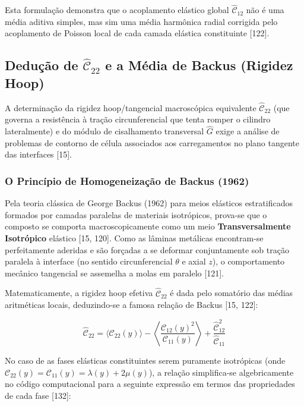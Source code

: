 Esta formulação demonstra que o acoplamento elástico global $\hat{\mathcal{C}}_{12}$ não é uma média aditiva simples, mas sim uma média harmônica radial corrigida pelo acoplamento de Poisson local de cada camada elástica constituinte [122].

\subsection{Dedução de $\hat{\mathcal{C}}_{22}$ e a Média de Backus (Rigidez Hoop)}

A determinação da rigidez hoop/tangencial macroscópica equivalente $\hat{\mathcal{C}}_{22}$ (que governa a resistência à tração circunferencial que tenta romper o cilindro lateralmente) e do módulo de cisalhamento transversal $\hat{G}$ exige a análise de problemas de contorno de célula associados aos carregamentos no plano tangente das interfaces [15].

\subsubsection{O Princípio de Homogeneização de Backus (1962)}

Pela teoria clássica de George Backus (1962) para meios elásticos estratificados formados por camadas paralelas de materiais isotrópicos, prova-se que o composto se comporta macroscopicamente como um meio \textbf{Transversalmente Isotrópico} elástico [15, 120]. Como as lâminas metálicas encontram-se perfeitamente aderidas e são forçadas a se deformar conjuntamente sob tração paralela à interface (no sentido circunferencial $\theta$ e axial $z$), o comportamento mecânico tangencial se assemelha a molas em paralelo [121].

Matematicamente, a rigidez hoop efetiva $\hat{\mathcal{C}}_{22}$ é dada pelo somatório das médias aritméticas locais, deduzindo-se a famosa relação de Backus [15, 122]:

\begin{equation}
  \hat{\mathcal{C}}_{22} = \langle \mathcal{C}_{22}(y) \rangle - \left\langle \frac{\mathcal{C}_{12}(y)^2}{\mathcal{C}_{11}(y)} \right\rangle + \frac{\hat{\mathcal{C}}_{12}^2}{\hat{\mathcal{C}}_{11}}
  \label{eq:C22_eff_final}
\end{equation}

No caso de as fases elásticas constituintes serem puramente isotrópicas (onde $\mathcal{C}_{22}(y) = \mathcal{C}_{11}(y) = \lambda(y) + 2 \mu(y)$), a relação simplifica-se algebricamente no código computacional para a seguinte expressão em termos das propriedades de cada fase [132]:

